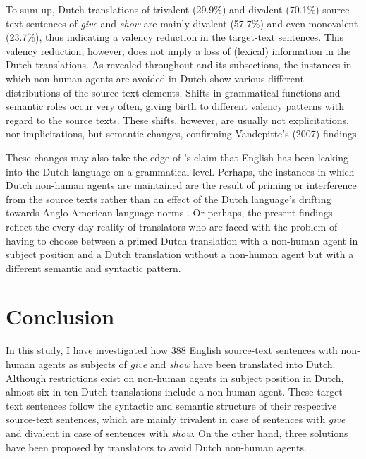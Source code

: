 \documentclass[output=paper]{LSP/langsci}
\begin{document}
To sum up, Dutch translations of trivalent (29.9\%) and divalent (70.1\%) source-text sentences of \textit{give} and \textit{show} are mainly divalent (57.7\%) and even monovalent (23.7\%), thus indicating a valency reduction in the target-text sentences. This valency reduction, however, does not imply a loss of (lexical) information in the Dutch translations. As revealed throughout  and its subsections, the instances in which non-human agents are avoided in Dutch show various different distributions of the source-text elements. Shifts in grammatical functions and semantic roles occur very often, giving birth to different valency patterns with regard to the source texts. These shifts, however, are usually not explicitations, nor implicitations, but semantic changes, confirming Vandepitte’s (2007) findings.

These changes may also take the edge of \citeauthor{Delsoir2011}'s \citeyear{Delsoir2011} claim that English has been leaking into the Dutch language on a grammatical level. Perhaps, the instances in which Dutch non-human agents are maintained are the result of priming \citep[see e.g.][]{Vandepitte2011,Delsoir2011} or interference from the source texts rather than an effect of the Dutch language’s drifting towards Anglo-American language norms \citep[see e.g.][]{House2008}. Or perhaps, the present findings reflect the every-day reality of translators who are faced with the problem of having to choose between a primed Dutch translation with a non-human agent in subject position and a Dutch translation without a non-human agent but with a different semantic and syntactic pattern. 

\section{Conclusion}

In this study, I have investigated how 388 English source-text sentences with non-human agents as subjects of \textit{give} and \textit{show} have been translated into Dutch. Although restrictions exist on non-human agents in subject position in Dutch, almost six in ten Dutch translations include a non-human agent. These target-text sentences follow the syntactic and semantic structure of their respective source-text sentences, which are mainly trivalent in case of sentences with \textit{give} and divalent in case of sentences with \textit{show}. On the other hand, three solutions have been proposed by translators to avoid Dutch non-human agents.
\end{document}
